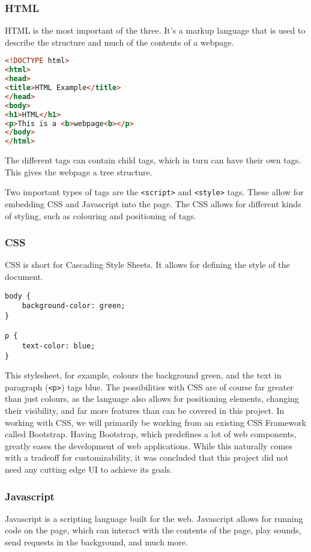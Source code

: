 \subsubsection{HTML}
HTML is the most important of the three.
It's a markup language that is used to describe the structure and much of the contents of a webpage.
\begin{lstlisting}[language=HTML]
<!DOCTYPE html>
<html>
<head>
<title>HTML Example</title>
</head>
<body>
<h1>HTML</h1>
<p>This is a <b>webpage<b></p>
</body>
</html>
\end{lstlisting}
The different tags can contain child tags, which in turn can have their own tags.
This gives the webpage a tree structure.

Two important types of tags are the \texttt{<script>} and \texttt{<style>} tags.
These allow for embedding CSS and Javascript into the page.
The CSS allows for different kinds of styling, such as colouring and positioning of tags.
\subsubsection{CSS}
CSS is short for Cascading Style Sheets. It allows for defining the style of the document.
\begin{lstlisting}
body {
	background-color: green;
}

p {
	text-color: blue;
}
\end{lstlisting}
This stylesheet, for example, colours the background green, and the text in paragraph (\texttt{<p>}) tags blue. The possibilities with CSS are of course far greater than just colours, as the language also allows for positioning elements, changing their visibility, and far more features than can be covered in this project.\cite{nixonweb}
In working with CSS, we will primarily be working from an existing CSS Framework called Bootstrap. Having Bootstrap, which predefines a lot of web components, greatly eases the development of web applications. While this naturally comes with a tradeoff for customizability, it was concluded that this project did not need any cutting edge UI to achieve its goals.
\subsubsection{Javascript}
Javascript is a scripting language built for the web.
Javascript allows for running code on the page, which can interact with the contents of the page, play sounds, send requests in the background, and much more.\cite{nixonweb}
